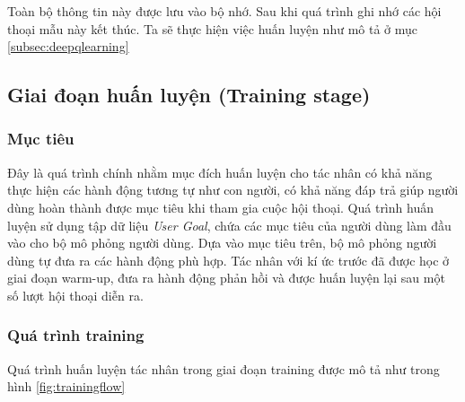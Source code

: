 Toàn bộ thông tin này được lưu vào bộ nhớ. Sau khi quá trình
ghi nhớ các hội thoại mẫu này kết thúc. Ta sẽ thực hiện việc
huấn luyện như mô tả ở mục \ref{subsec:deepqlearning}

\subsection{Giai đoạn huấn luyện (Training stage)}

\subsubsection{Mục tiêu}
Đây là quá trình chính nhằm mục đích huấn luyện cho tác nhân có
khả năng thực hiện các hành động tương tự như con người, có
khả năng đáp trả giúp người dùng hoàn thành được mục tiêu khi
tham gia cuộc hội thoại. Quá trình huấn luyện sử dụng tập dữ liệu
\textit{User Goal}, chứa các mục tiêu của người dùng làm đầu vào
cho bộ mô phỏng người dùng. Dựa vào mục tiêu trên, bộ mô phỏng
người dùng tự đưa ra các hành động phù hợp. Tác nhân với kí ức trước
đã được học ở giai đoạn warm-up, đưa ra hành động phản hồi và
được huấn luyện lại sau một số lượt hội thoại diễn ra.

\subsubsection{Quá trình training}
Quá trình huấn luyện tác nhân trong giai đoạn training được mô tả
như trong hình \ref{fig:trainingflow}

